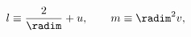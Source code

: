 \begin{equation}
\label{eq:lmdefs}
l \equiv \frac{2}{\radim} + u, \qquad m \equiv \radim^2 v,
\end{equation}

